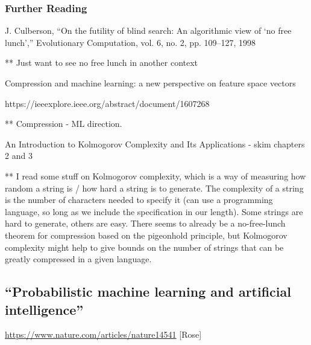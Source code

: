 \documentclass[12pt]{article}
\begin{document}
\subsubsection*{Further Reading} 

J. Culberson, “On the futility of blind search: An algorithmic view of
‘no free lunch’,” Evolutionary Computation, vol. 6, no. 2, pp. 109–127,
1998

** Just want to see no free lunch in another context

\bigskip

Compression and machine learning: a new perspective on feature space vectors

https://ieeexplore.ieee.org/abstract/document/1607268

** Compression - ML direction. 


\bigskip

An Introduction to Kolmogorov Complexity and Its Applications - skim chapters 2 and 3

** I read some stuff on Kolmogorov complexity, which is a way of measuring how random a string is / how hard a string is to generate. The complexity of a string is the number of characters needed to specify it (can use a programming language, so long as we include the specification in our length). Some strings are hard to generate, others are easy. There seems to already be a no-free-lunch theorem for compression based on the pigeonhold principle, but Kolmogorov complexity might help to give bounds on the number of strings that can be greatly compressed in a given language. 

\newpage

\subsection*{“Probabilistic machine learning and artificial intelligence”}
\url{https://www.nature.com/articles/nature14541} [Rose]
\end{document}
